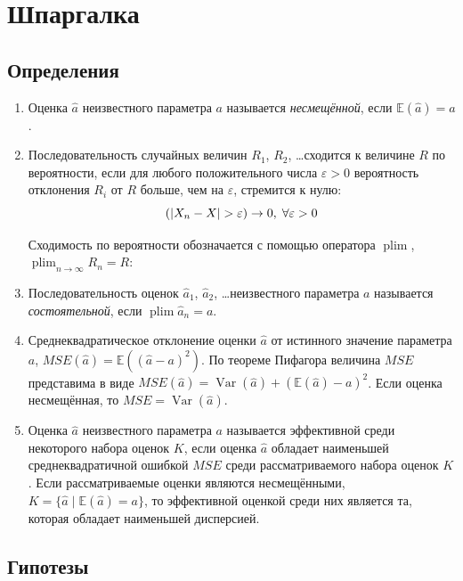 \documentclass[12pt, a4paper]{article}
\DeclareMathOperator{\Var}{Var}
\DeclareMathOperator*{\plim}{plim}
\let\P\relax
\newcommand{\P}{\mathbb{P}}
\newcommand{\E}{\mathbb{E}}
\begin{document}
\section{Шпаргалка}

\subsection{Определения}


\begin{enumerate}

  \item Оценка $\hat a$ неизвестного параметра $a$ называется \textit{несмещённой}, если $\E(\hat a) = a$.

  \item Последовательность случайных величин $R_1$, $R_2$, \ldots сходится к величине $R$ по вероятности, если
  для любого положительного числа $\varepsilon >0$ вероятность отклонения $R_i$ от $R$ больше, чем на $\varepsilon$, 
  стремится к нулю:
  \[
  \P(\abs{X_n - X} > \varepsilon ) \to 0, \; \forall \varepsilon > 0
  \]

Сходимость по вероятности обозначается с помощью оператора $\plim$, $\plim_{n\to\infty} R_n = R$:


  \item Последовательность оценок $\hat a_1$, $\hat a_2$, \ldots неизвестного параметра $a$ называется \textit{состоятельной}, если $\plim \hat a_n = a$.

 
\item Среднеквадратическое отклонение оценки $\hat a$ от истинного значение параметра $a$, $MSE(\hat a)=\E((\hat a - a)^2)$. По теореме Пифагора величина $MSE$ представима в виде $MSE(\hat a) = \Var(\hat a) + (\E(\hat a) - a)^2$. Если оценка несмещённая, то $MSE = \Var(\hat a)$.

\item Оценка $\hat a$ неизвестного параметра $a$ называется эффективной среди некоторого набора оценок $K$, 
если оценка $\hat a$ обладает наименьшей среднеквадратичной ошибкой $MSE$ среди рассматриваемого набора оценок $K$. 
Если рассматриваемые оценки являются несмещёнными, $K = \{\hat a \mid \E(\hat a) = a\}$, 
то эффективной оценкой среди них является та, которая обладает наименьшей дисперсией.

\end{enumerate}


\subsection{Гипотезы}
\end{document}
